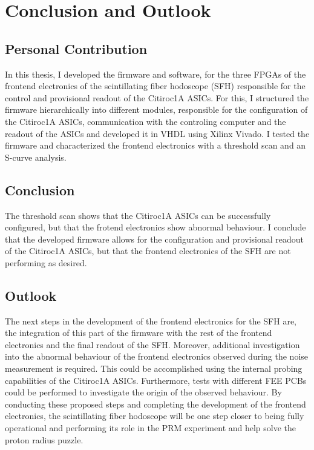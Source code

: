 \chapter{Conclusion and Outlook}
\noindent
\section{Personal Contribution}
In this thesis, I developed the firmware and software, 
for the three FPGAs of the frontend electronics of the scintillating fiber hodoscope (SFH) responsible for the control and provisional readout of the Citiroc1A ASICs.
\newline
For this, I structured the firmware hierarchically into different modules, responsible for the configuration of the Citiroc1A ASICs, communication with the controling computer and the readout of the ASICs and developed it in VHDL using Xilinx Vivado.
\newline
I tested the firmware and characterized the frontend electronics with a threshold scan and an S-curve analysis.
\section{Conclusion}
The threshold scan shows that the Citiroc1A ASICs can be successfully configured, but that the frotend electronics show abnormal behaviour.
I conclude that the developed firmware allows for the configuration and provisional readout of the Citiroc1A ASICs, 
but that the frontend electronics of the SFH are not performing as desired.

\section{Outlook}
The next steps in the development of the frontend electronics for the SFH are,
the integration of this part of the firmware with the rest of the frontend electronics and the final readout of the SFH.
Moreover, additional investigation into the abnormal behaviour of the frontend electronics observed during the noise measurement is required.
\newline
This could be accomplished using the internal probing capabilities of the Citiroc1A ASICs.
Furthermore, tests with different FEE PCBs could be performed to investigate the origin of the observed behaviour.
\newline
By conducting these proposed steps and completing the development of the frontend electronics,
the scintillating fiber hodoscope will be one step closer to being fully operational and performing its role in the PRM experiment and help solve the proton radius puzzle.
